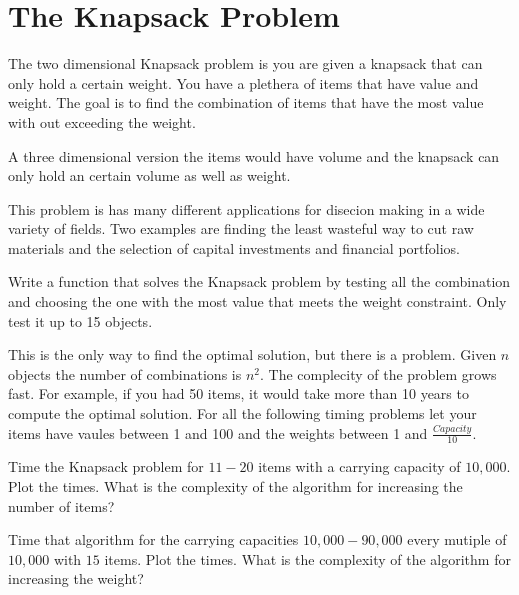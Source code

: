 \label{Ch:Knapsack}


\section*{The Knapsack Problem}


The two dimensional Knapsack problem is you are given a knapsack that can only hold a certain weight. You have a plethera of items that have value and weight. The goal is to find the combination of items that have the most value with out exceeding the weight.

A three dimensional version the items would have volume and the knapsack can only hold an certain volume as well as weight. 

This problem is has many different applications for disecion making in a wide variety of fields. Two examples are finding the least wasteful way to cut raw materials and the selection of capital investments and financial portfolios.

\begin{problem}
Write a function that solves the Knapsack problem by testing all the combination and choosing the one with the most value that meets the weight constraint. Only test it up to 15 objects.
\end{problem}

This is the only way to find the optimal solution, but there is a problem. Given $n$ objects the number of combinations is $n^2$. The complecity of the problem grows fast. For example, if you had 50 items, it would take more than 10 years to compute the optimal solution. For all the following timing problems let your items have vaules between 1 and 100 and the weights between 1 and $\frac{Capacity}{10}$.

\begin{problem}
Time the Knapsack problem for $11-20$ items with a carrying capacity of $10,000$. Plot the times. What is the complexity of the algorithm for increasing the number of items?
\end{problem}

\begin{problem}
Time that algorithm for the carrying capacities $10,000-90,000$ every mutiple of $10,000$ with $15$ items. Plot the times. What is the complexity of the algorithm for increasing the weight?
\end{problem}

